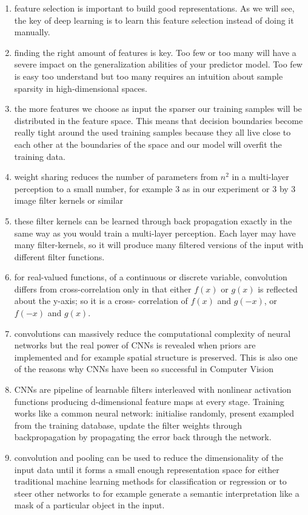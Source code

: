 \documentclass[11pt]{article}
\begin{document}
\begin{enumerate}
    \item feature selection is important to build good representations. As we will
    see, the key of deep learning is to learn this feature selection instead of     doing it manually. 
    \item finding the right amount of features is key. Too few or too many will have a severe impact on the generalization abilities of your predictor model. Too few is easy too understand but too many requires an intuition about sample sparsity in high-dimensional spaces.
    \item the more features we choose as input the sparser our training samples will be distributed in the feature space. This means that decision boundaries become really tight around the used training samples because they all live close to each other at the boundaries of the space and our model will overfit the training data.
    \item weight sharing reduces the number of parameters from $n^2$ in a multi-layer perception to a small number, for example 3 as in our experiment or 3 by 3 image filter kernels or similar
    \item these filter kernels can be learned through back propagation exactly in the same way as you would train a multi-layer perception. Each layer may have many filter-kernels, so it will produce many filtered versions of the input with different filter functions.
    \item for real-valued functions, of a continuous or discrete variable, convolution differs from cross-correlation only in that either $f(x)$ or $g(x)$ is reflected about the y-axis; so it is a cross- correlation of $f(x)$ and $g(-x)$, or $f(-x)$ and $g(x)$.
    \item convolutions can massively reduce the computational complexity of neural networks but the real power of CNNs is revealed when priors are implemented and for example spatial structure is preserved. This is also one of the reasons why CNNs have been so successful in Computer Vision
    \item CNNs are pipeline of learnable filters interleaved with nonlinear activation functions producing d-dimensional feature maps at every stage. Training works like a common neural network: initialise randomly, present exampled from the training database, update the filter weights through backpropagation by propagating the error back through the network.
    \item convolution and pooling can be used to reduce the dimensionality of the input data until it forms a small enough representation space for either traditional machine learning methods for classification or regression or to steer other networks to for example generate a semantic interpretation like a mask of a particular object in the input.
\end{enumerate}
 
\end{document}
